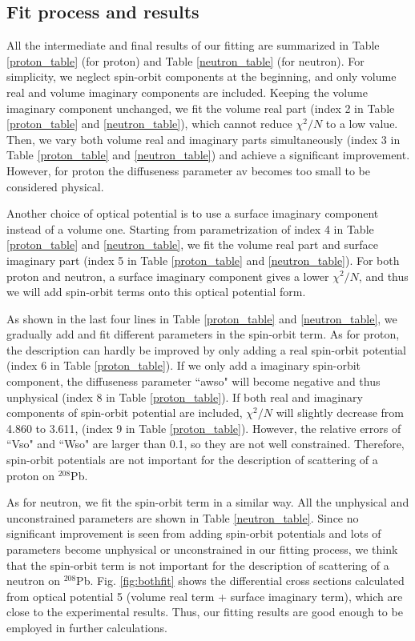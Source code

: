 \subsection{Fit process and results}
All the intermediate and final results of our fitting are summarized in Table \ref{proton_table} (for proton) and Table \ref{neutron_table} (for neutron). 
For simplicity, we neglect spin-orbit components at the beginning, and only volume real and volume imaginary components are included. 
Keeping the volume imaginary component unchanged, we fit the volume real part (index 2 in Table \ref{proton_table} and \ref{neutron_table}), 
which cannot reduce $\chi^2/N$ to a low value. 
Then, we vary both volume real and imaginary parts simultaneously (index 3 in Table \ref{proton_table} and \ref{neutron_table}) and 
achieve a significant improvement.  
However, for proton the diffuseness parameter av becomes too small to be considered physical. 
\par
Another choice of optical potential is to use a surface imaginary component instead of a volume one. 
Starting from parametrization of index 4 in Table \ref{proton_table} and \ref{neutron_table}, we fit the volume real part and surface imaginary part 
(index 5 in Table \ref{proton_table} and \ref{neutron_table}). 
For both proton and neutron, a surface imaginary component gives a lower $\chi^2/N$, 
and thus we will add spin-orbit terms onto this optical potential form. 
\par
As shown in the last four lines in Table \ref{proton_table} and \ref{neutron_table}, 
we gradually add and fit different parameters in the spin-orbit term.  
As for proton, the description can hardly be improved by only adding a real spin-orbit potential (index 6 in Table \ref{proton_table}).  
If we only add a imaginary spin-orbit component, the diffuseness parameter ``awso" will become negative and thus unphysical 
(index 8 in Table \ref{proton_table}). 
If both real and imaginary components of spin-orbit potential are included, $\chi^2/N$ will slightly decrease from 4.860 to 3.611,
(index 9 in Table \ref{proton_table}). 
However, the relative errors of ``Vso" and ``Wso" are larger than 0.1, so they are not well constrained. 
Therefore, spin-orbit potentials are not important for the description of scattering of a proton on $^{208}$Pb. 
\par
As for neutron, we fit the spin-orbit term in a similar way. 
All the unphysical and unconstrained parameters are shown in Table \ref{neutron_table}. 
Since no significant improvement is seen from adding spin-orbit potentials and lots of parameters become unphysical or unconstrained 
in our fitting process, we think that the spin-orbit term is not important for the description of scattering of a neutron on $^{208}$Pb. 
Fig. \ref{fig:bothfit} shows the differential cross sections calculated from optical potential 5 
(volume real term + surface imaginary term), which are close to the experimental results. 
Thus, our fitting results are good enough to be employed in further calculations.  

